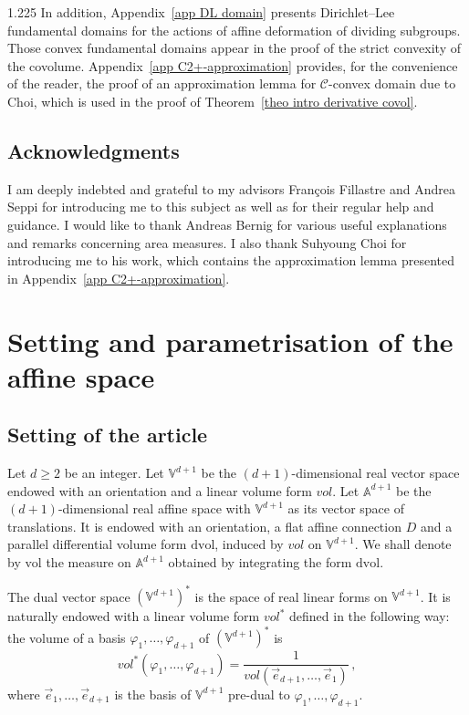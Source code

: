 \documentclass[reqno, a4paper]{amsart}
\numberwithin{equation}{section}
\numberwithin{figure}{section}
\theoremstyle{definition}
\theoremstyle{remark}
\newcommand{\V}{\mathbb{V}} %
\newcommand{\A}{\mathbb{A}} %
\newcommand{\dif}{\mathrm{d}} %
\newcommand{\C}{\mathcal{C}} %
\newcommand{\linvol}{\mathit{vol}} %
\newcommand{\vol}{\mathrm{vol}} %
\newcommand{\dvol}{\dif \mathrm{vol}} %
\begin{document}
\begin{spacing}{1.225}
In addition, Appendix~\ref{app DL domain} presents Dirichlet--Lee fundamental domains for the actions of affine deformation of dividing subgroups. Those convex fundamental domains appear in the proof of the strict convexity of the covolume. Appendix~\ref{app C2+-approximation} provides, for the convenience of the reader, the proof of an approximation lemma for $\C$-convex domain due to Choi, which is used in the proof of Theorem~\ref{theo intro derivative covol}. 

\subsection*{Acknowledgments} I am deeply indebted and grateful to my advisors Fran\c{c}ois Fillastre and Andrea Seppi for introducing me to this subject as well as for their regular help and guidance. I would like to thank Andreas Bernig for various useful explanations and remarks concerning area measures. I also thank Suhyoung Choi for introducing me to his work, which contains the approximation lemma presented in Appendix~\ref{app C2+-approximation}. 

\section{Setting and parametrisation of the affine space}
\label{sec (P)}

\subsection{Setting of the article}

Let $d \geq 2$ be an integer. Let $\V^{d+1}$ be the $(d+1)$-dimensional real vector space endowed with an orientation and a linear volume form $\linvol$. Let $\A^{d+1}$ be the $(d+1)$-dimensional real affine space with $\V^{d+1}$ as its vector space of translations. It is endowed with an orientation, a flat affine connection $D$ and a parallel differential volume form $\dvol$, induced by $\linvol$ on $\V^{d+1}$. We shall denote by $\vol$ the measure on $\A^{d+1}$ obtained by integrating the form $\dvol$.

The dual vector space $(\V^{d+1})^*$ is the space of real linear forms on $\V^{d+1}$. It is naturally endowed with a linear volume form $\linvol^*$ defined in the following way: the volume of a basis $\varphi_1, \dots,\varphi_{d+1}$ of $(\V^{d+1})^*$ is 
\begin{equation*}
 \linvol^*(\varphi_1, \dots,\varphi_{d+1}) = \frac{1}{\linvol(\vec{e}_{d+1},\dots,\vec{e}_1)} \, ,
\end{equation*}
where $\vec{e}_1,\dots,\vec{e}_{d+1}$ is the basis of $\V^{d+1}$ pre-dual to $\varphi_1, \dots,\varphi_{d+1}$.


\end{spacing}
\end{document}
